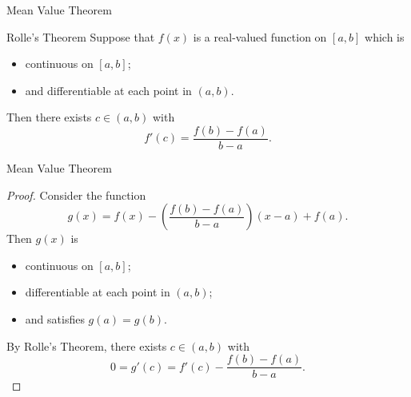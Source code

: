 \documentclass{beamer}
\begin{document}
\begin{frame}{Mean Value Theorem}
\begin{thm}{Rolle's Theorem}
Suppose that $f(x)$ is a real-valued function on $[a,b]$ which is
\begin{itemize}
\pause
\item continuous on $[a,b]$;
\pause
\item and differentiable at each point in $(a,b)$.
\end{itemize}
\pause
Then there exists $c\in (a,b)$ with
$$f'(c) = \frac{f(b)-f(a)}{b-a}.$$
\end{thm}
\end{frame}

\begin{frame}{Mean Value Theorem}
\begin{proof}
Consider the function
$$g(x) = f(x)-\left(\frac{f(b)-f(a)}{b-a}\right)(x-a) + f(a).$$
\pause
Then $g(x)$ is
\begin{itemize}
\pause
\item continuous on $[a,b]$;
\pause
\item differentiable at each point in $(a,b)$;
\pause
\item and satisfies $g(a) = g(b)$.
\end{itemize}
\pause
By Rolle's Theorem, there exists $c\in (a,b)$ with
$$0 = g'(c) = f'(c) -\frac{f(b)-f(a)}{b-a}.$$
\end{proof}
\end{frame}
\end{document}
